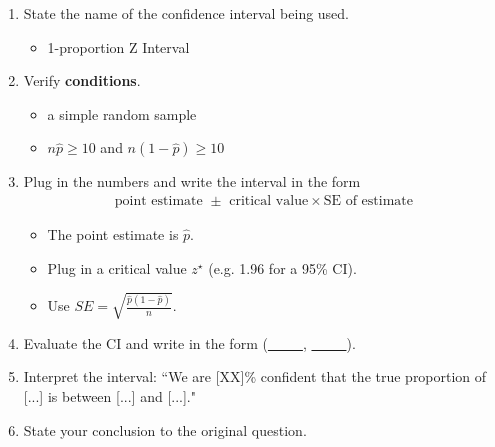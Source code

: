 \begin{termBox}{
\begin{enumerate}
\setlength{\itemsep}{0mm}
\item State the name of the confidence interval being used.\vspace{-1.5mm}
\begin{itemize}
\item 1-proportion Z Interval
\end{itemize}
\item Verify \textbf{conditions}.\vspace{-1.5mm}
\begin{itemize}
\setlength{\itemsep}{0mm}
\item a simple random sample
\item $n\hat{p} \geq10$ and $n(1-\hat{p})\geq10$
\end{itemize}
\item Plug in the numbers and write the interval in the form\vspace{-1.5mm}
\begin{align*}
\text{point estimate } \pm \text{ critical value}\times \text{SE of estimate}
\end{align*}
\begin{itemize}
\item The point estimate is $\hat{p}$.
\item Plug in a critical value $z^\star$ (e.g. 1.96 for a 95\% CI).
\item Use $SE = \sqrt{\frac{\hat{p}(1-\hat{p})}{n}}$.
\end{itemize}
\item Evaluate the CI and write in the form (\underline{\ \ \ \ \ }, \underline{\ \ \ \ \ }).
\item Interpret the interval:  ``We are [XX]\% confident that the true proportion of [...] is between [...] and [...]."
\item State your conclusion to the original question.
\end{enumerate}}
\end{termBox}

